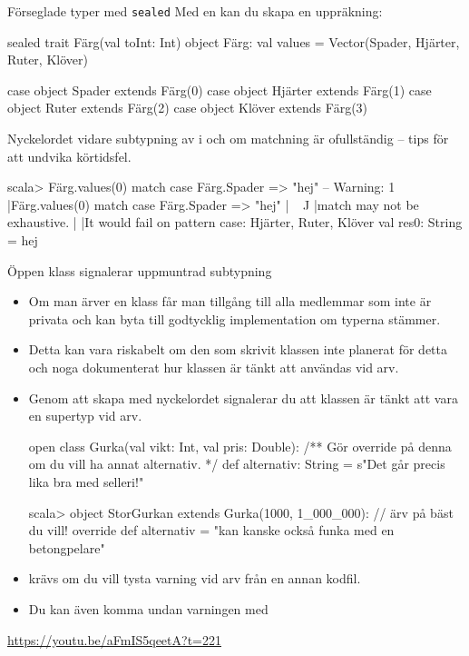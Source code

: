 \begin{Slide}{Förseglade typer med \texttt{sealed}}\SlideFontSmall
Med en  kan du skapa en  uppräkning:
\begin{Code}
sealed trait Färg(val toInt: Int)
object Färg:
  val values = Vector(Spader, Hjärter, Ruter, Klöver)
  
  case object Spader  extends Färg(0)
  case object Hjärter extends Färg(1)
  case object Ruter   extends Färg(2)
  case object Klöver  extends Färg(3)
\end{Code}
Nyckelordet   vidare subtypning av  i  och  om matchning är ofullständig -- tips för att undvika körtidsfel.

\begin{REPLsmall}
scala> Färg.values(0) match { case Färg.Spader => "hej" }
-- Warning:
1 |Färg.values(0) match { case Färg.Spader => "hej" }
  |^^^^^^^^^^^^^^
  |match may not be exhaustive.
  |
  |It would fail on pattern case: Hjärter, Ruter, Klöver
val res0: String = hej
\end{REPLsmall}
\end{Slide}
  
        
  

\begin{Slide}{Öppen klass signalerar uppmuntrad subtypning}\SlideFontSmall
\begin{itemize}
\item Om man ärver en klass får man tillgång till alla medlemmar som inte är privata och kan byta till godtycklig implementation om typerna stämmer.
\item Detta kan vara riskabelt om den som skrivit klassen inte planerat för detta och noga dokumenterat hur klassen är tänkt att användas vid arv. 
\item Genom att skapa \Emph{öppna klasser} med nyckelordet \code{open} signalerar du att klassen är tänkt att vara en supertyp vid arv.
\begin{Code}
open class Gurka(val vikt: Int, val pris: Double):
  /** Gör override på denna om du vill ha annat alternativ. */
  def alternativ: String = s"Det går precis lika bra med selleri!"  
\end{Code}
\begin{REPLsmall}
scala> object StorGurkan extends Gurka(1000, 1_000_000): // ärv på bäst du vill!
         override def alternativ = "kan kanske också funka med en betongpelare"
\end{REPLsmall}
\item {} krävs om du vill tysta varning vid arv från en annan kodfil.
\item Du kan även komma undan varningen med  
\end{itemize}  

\url{https://youtu.be/aFmIS5qeetA?t=221}
\end{Slide}


